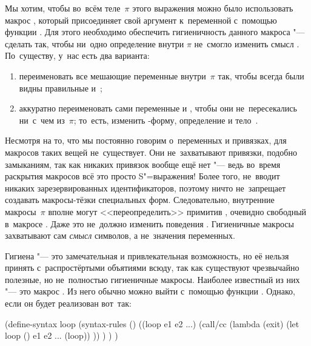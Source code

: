 Мы хотим, чтобы во~всём теле~$\pi$ этого выражения можно было использовать
макрос , который присоединяет свой аргумент к~переменной 
с~помощью функции . Для этого необходимо обеспечить гигиеничность
данного макроса "--- сделать так, чтобы ни~одно определение внутри $\pi$ не~смогло
изменить смысл . По~существу, у~нас есть два варианта:

\begin{enumerate}
  \item переименовать все мешающие переменные внутри~$\pi$ так, чтобы
        всегда были видны правильные  и~;

  \item аккуратно переименовать сами переменные  и ,
        чтобы они не~пересекались ни~с~чем из~$\pi$; то~есть, изменить
        -форму, определение  и тело~.
\end{enumerate}

Несмотря на то, что мы постоянно говорим о~переменных и привязках, для макросов
таких вещей не~существует. Они не~захватывают привязки, подобно замыканиям, так
как никаких привязок вообще ещё нет "--- ведь во~время раскрытия макросов всё
это просто S"=выражения! Более того, {\RnRS} не~вводит никаких зарезервированных
идентификаторов, поэтому ничто не~запрещает создавать макросы-тёзки специальных
форм. Следовательно, внутренние макросы~$\pi$ вполне могут <<переопределить>>
примитив , очевидно свободный в~макросе . Даже это не~должно
изменить поведения . Гигиеничные макросы захватывают сам \emph{смысл}
символов, а не~значения переменных.

Гигиена "--- это замечательная и привлекательная возможность, но её нельзя
принять с~распростёртыми объятиями всюду, так как существуют чрезвычайно
полезные, но не~полностью гигиеничные макросы. Наиболее известный из них "---
это макрос . Из него обычно можно выйти с~помощью функции .
Однако, если он будет реализован вот~так:

\begin{code:lisp}
(define-syntax loop
  (syntax-rules ()
    ((loop e1 e2 ...)
     (call/cc (lambda (exit)
                (let loop () e1 e2 ... (loop)) )) ) ) )
\end{code:lisp}

